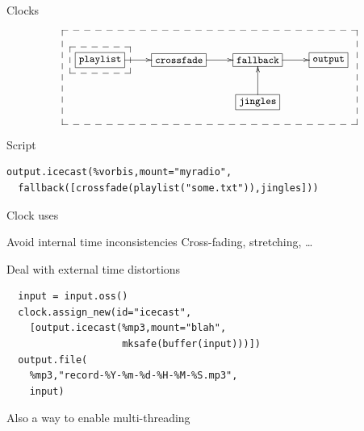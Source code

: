\documentclass{beamer}
\begin{document}
\begin{frame}[fragile]{Clocks}

\[ \small
\xymatrix{
   *+[F]{\mathtt{playlist}}\ar[r]
   {\save "1,1"*+<10pt>[F--]\frm{} \restore}
   & *+[F]{\mathtt{crossfade}}\ar[r] &
      *+[F]{\mathtt{fallback}}\ar[r]& *+[F]{\mathtt{output}} \\
   & & *+[F]{\mathtt{jingles}}\ar[u]
   {\save "2,3"-<20pt>."1,4"."1,1"*+<20pt>[F--]\frm{} \restore}
   &
}
\]

\vfill

\begin{block}{Script}
\begin{lstlisting}
output.icecast(%vorbis,mount="myradio",
  fallback([crossfade(playlist("some.txt")),jingles]))
\end{lstlisting}
\end{block}

\end{frame}

\begin{frame}[fragile]{Clock uses}

\begin{block}{Avoid internal time inconsistencies}
\quad Cross-fading, stretching, \ldots
\end{block}

\vfill

\begin{block}{Deal with external time distortions}
\begin{lstlisting}
  input = input.oss()
  clock.assign_new(id="icecast",
    [output.icecast(%mp3,mount="blah",
                    mksafe(buffer(input)))])
  output.file(
    %mp3,"record-%Y-%m-%d-%H-%M-%S.mp3",
    input)
\end{lstlisting}
\end{block}

Also a way to enable multi-threading
\end{frame}

\end{document}
